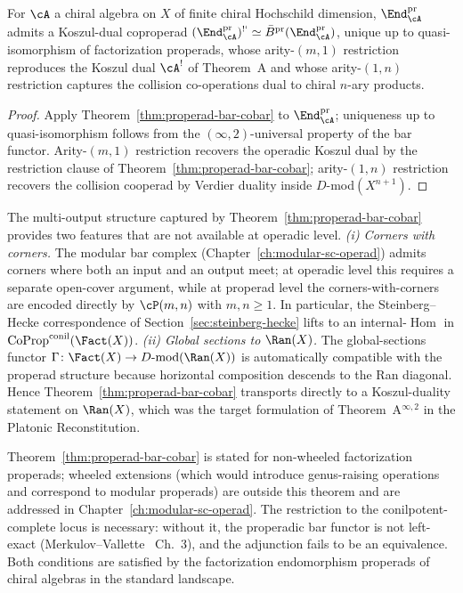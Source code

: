 \begin{corollary}
\label{cor:chiral-properad-koszul}
For $\cA$ a chiral algebra on $X$ of finite chiral Hochschild
dimension, $\End^{\mathrm{pr}}_\cA$ admits a Koszul-dual
coproperad
$(\End^{\mathrm{pr}}_\cA)^{\mathrm{!`}}
 \simeq \bar B^{\mathrm{pr}}(\End^{\mathrm{pr}}_\cA)$,
unique up to quasi-isomorphism of factorization properads, whose
arity-$(m,1)$ restriction reproduces the Koszul dual $\cA^!$ of
Theorem~A and whose arity-$(1,n)$ restriction captures the
collision co-operations dual to chiral $n$-ary products.
\end{corollary}
\begin{proof}
Apply Theorem~\ref{thm:properad-bar-cobar} to
$\End^{\mathrm{pr}}_\cA$; uniqueness up to quasi-isomorphism
follows from the $(\infty,2)$-universal property of the bar
functor. Arity-$(m,1)$ restriction recovers the operadic Koszul
dual by the restriction clause of
Theorem~\ref{thm:properad-bar-cobar}; arity-$(1,n)$ restriction
recovers the collision cooperad by Verdier duality inside
$D$-mod$(X^{n+1})$.
\end{proof}

\begin{remark}
\label{rem:properad-payoff}
The multi-output structure captured by
Theorem~\ref{thm:properad-bar-cobar} provides two features that
are not available at operadic level.
\emph{(i) Corners with corners.} The modular bar complex
(Chapter~\ref{ch:modular-sc-operad}) admits corners
where both an input and an output meet; at operadic level
this requires a separate open-cover argument, while at properad
level the corners-with-corners are encoded directly by
$\cP(m,n)$ with $m,n\geq 1$. In particular, the
Steinberg--Hecke correspondence of
Section~\ref{sec:steinberg-hecke} lifts to an
internal-$\operatorname{Hom}$ in
$\operatorname{CoProp}^{\mathrm{conil}}(\Fact(X))$.
\emph{(ii) Global sections to $\Ran(X)$.} The global-sections
functor
$\Gamma\colon\Fact(X)\to D\text{-mod}(\Ran(X))$
is automatically compatible with the properad structure because
horizontal composition descends to the Ran diagonal. Hence
Theorem~\ref{thm:properad-bar-cobar} transports directly to a
Koszul-duality statement on $\Ran(X)$, which was the target
formulation of Theorem~A${}^{\infty,2}$ in the Platonic
Reconstitution.
\end{remark}

\begin{remark}
\label{rem:properad-range}
Theorem~\ref{thm:properad-bar-cobar} is stated for non-wheeled
factorization properads; wheeled extensions (which would
introduce genus-raising operations and correspond to modular
properads) are outside this theorem and are addressed in
Chapter~\ref{ch:modular-sc-operad}. The restriction
to the conilpotent-complete locus is necessary: without it,
the properadic bar functor is not left-exact (Merkulov--Vallette~\cite{MV09}
Ch.~3), and the adjunction fails to be an equivalence. Both
conditions are satisfied by the factorization endomorphism
properads of chiral algebras in the standard landscape.
\end{remark}

